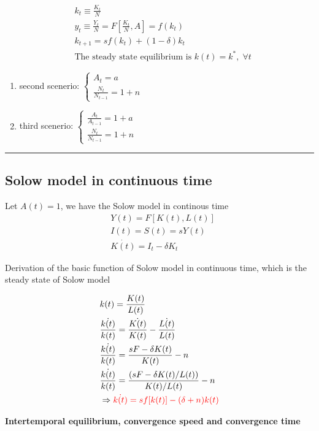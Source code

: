 \documentclass{article}
\newcommand*\sepline{%
  \begin{center}
    \rule[1ex]{.5\textwidth}{.5pt}
  \end{center}}
\begin{document}
\begin{align}
& k_{t}\equiv \frac{K_{t}}{N}
\\&y_{t}\equiv \frac{Y_{t}}{N}=F[\frac{K_{t}}{N},A]=f(k_{t})
\\&k_{t+1}=sf(k_{t})+(1-\delta)k_{t}
\\&\text{The steady state equilibrium is } k(t)=k^{*},\; \forall t
\end{align}

\begin{enumerate}
\def\labelenumi{\roman{enumi})}
\setcounter{enumi}{1}
  \item second scenerio: $\begin{cases}
  A_{t} =a \\
  \frac{N_{t}}{N_{t-1}}=1+n\end{cases}$
  \item third scenerio: $\begin{cases}
  \frac{A_{t}}{A_{t-1}} =1+a \\
  \frac{N_{t}}{N_{t-1}}=1+n\end{cases}$
\end{enumerate}

\sepline
\subsection{Solow model in continuous time}\label{solow-model-in-continuous-time}

Let $A(t)=1$, we have the Solow model in continous time 
\begin{align}
&Y(t)=F[K(t),L(t)]
\\&I(t)=S(t)=sY(t)
\\&\dot{K(t)}=I_{t}-\delta K_{t}
\end{align}


Derivation of the basic function of Solow model in continuous time,
which is the steady state of Solow model 

\begin{align}
&k(t)=\frac{K(t)}{L(t)}
\\&\frac{\dot{k(t)}}{k(t)}=\frac{\dot{K(t)}}{K(t)}-\frac{\dot{L(t)}}{L(t)}
\\&\frac{\dot{k(t)}}{k(t)}=\frac{sF-\delta K(t)}{K(t)}-n
\\&\frac{\dot{k(t)}}{k(t)}=\frac{(sF-\delta K(t)/L(t))}{K(t)/L(t)}-n
\\&\Rightarrow \color{red} \dot{k(t)}=sf[k(t)]-(\delta+n)k(t)
\end{align}


\textbf{Intertemporal equilibrium, convergence speed and convergence time}
\end{document}
